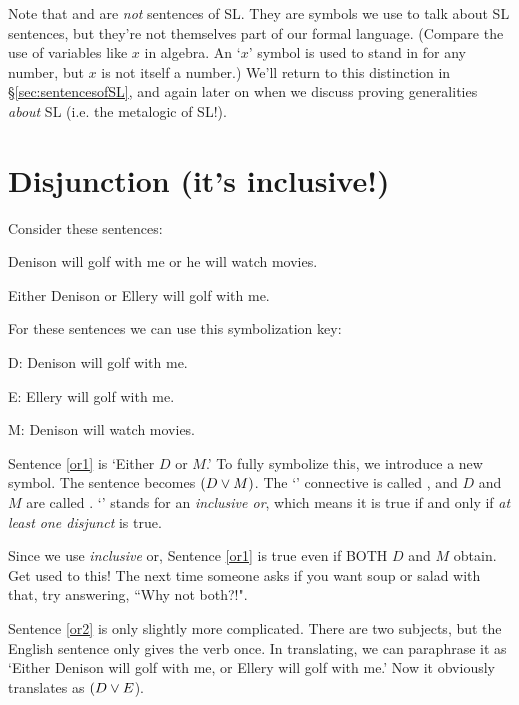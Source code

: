Note that \metaA{} and \metaB{} are \emph{not} sentences of SL. They are symbols we use to talk about SL sentences, but they're not themselves part of our formal language. (Compare the use of variables like $x$ in algebra. An `$x$' symbol is used to stand in for any number, but $x$ is not itself a number.) We'll return to this distinction in \S\ref{sec:sentencesofSL}, and again later on when we discuss proving generalities \textit{about} SL (i.e. the metalogic of SL!).


\section{Disjunction (it's inclusive!)}
Consider these sentences:
\begin{earg}
\item[\ex{or1}]Denison will golf with me or he will watch movies.
\item[\ex{or2}]Either Denison or Ellery will golf with me. 
\end{earg}

For these sentences we can use this symbolization key:

\begin{ekey}
\item[D:] Denison will golf with me.
\item[E:] Ellery will golf with me.
\item[M:] Denison will watch movies.
\end{ekey}

Sentence \ref{or1} is `Either $D$ or $M$.' To fully symbolize this, we introduce a new symbol. The sentence becomes $(D \vee M)$. The `\eor' connective is called , and $D$ and $M$ are called . `\eor' stands for an \emph{inclusive or}, which means it is true if and only if \emph{at least one disjunct} is true.

{\color{black}Since we use \textit{inclusive} or, Sentence \ref{or1} is true even if BOTH $D$ and $M$ obtain. Get used to this! The next time someone asks if you want soup or salad with that, try answering, ``Why not both?!".}

Sentence \ref{or2} is only slightly more complicated. There are two subjects, but the English sentence only gives the verb once. In translating, we can paraphrase it as `Either Denison will golf with me, or Ellery will golf with me.' Now it obviously translates as $(D \vee E$).


